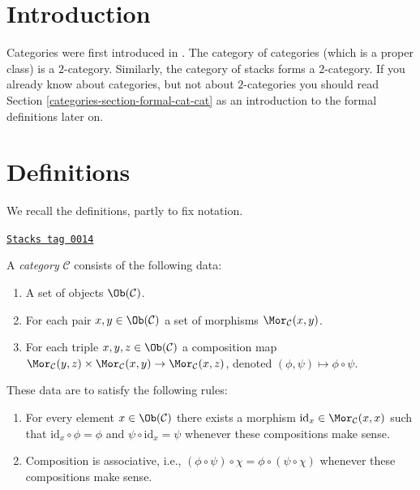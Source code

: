 \section{Introduction}
\label{categories-section-introduction}
Categories were first introduced in \cite{GenEqui}.
The category of categories (which is a proper class)
is a $2$-category. Similarly, the category of stacks
forms a $2$-category. If you already know
about categories, but not about $2$-categories you
should read
Section \ref{categories-section-formal-cat-cat}
as an introduction to the formal definitions later on.

\section{Definitions}
\label{categories-section-definition-categories}
We recall the definitions, partly to fix notation.

\begin{definition}[Category]
\label{categories-definition-category}
\href{https://stacks.math.columbia.edu/tag/0014}{\texttt{Stacks tag 0014}}

A {\it category} $\mathcal{C}$ consists of the following data:
\begin{enumerate}
\item A set of objects $\Ob(\mathcal{C})$.
\item For each pair $x, y \in \Ob(\mathcal{C})$ a set of morphisms
$\Mor_\mathcal{C}(x, y)$.
\item For each triple $x, y, z\in \Ob(\mathcal{C})$ a composition
map $ \Mor_\mathcal{C}(y, z) \times \Mor_\mathcal{C}(x, y)
\to \Mor_\mathcal{C}(x, z) $, denoted $(\phi, \psi) \mapsto
\phi \circ \psi$.
\end{enumerate}
These data are to satisfy the following rules:
\begin{enumerate}
\item For every element $x\in \Ob(\mathcal{C})$ there exists a
morphism $\text{id}_x\in \Mor_\mathcal{C}(x, x)$ such that
$\text{id}_x \circ \phi = \phi$ and $\psi \circ \text{id}_x = \psi $ whenever
these compositions make sense.
\item Composition is associative, i.e., $(\phi \circ \psi) \circ \chi =
\phi \circ ( \psi \circ \chi)$ whenever these compositions make sense.
\end{enumerate}
\end{definition}

